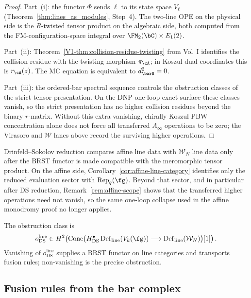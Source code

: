 \begin{proof}
Part~(i): the functor $\Phi$ sends $\ell$ to its state space $V_\ell$
\textup{(}Theorem~\textup{\ref{thm:lines_as_modules}}, Step~4\textup{)}.
The two-line OPE on the physical side is the $R$-twisted tensor product
on the algebraic side, both computed from the FM-configuration-space
integral over $\FM_2(\bC)\times E_1(2)$.

Part~(ii): Theorem~\textup{\ref{V1-thm:collision-residue-twisting}} from
Vol~I identifies the collision residue with the twisting morphism
$\pi_\cA$; in Koszul-dual coordinates this is $r_\cA(z)$. The
MC equation is equivalent to $d^2_{\barB}=0$.

Part~(iii): the ordered-bar spectral sequence controls the obstruction
classes of the strict tensor presentation. On the DNP one-loop exact
surface these classes vanish, so the strict presentation has no
higher collision residues beyond the binary $r$-matrix. Without this
extra vanishing, chirally Koszul PBW concentration alone does not
force all transferred $A_\infty$ operations to be zero; the Virasoro
and $\mathcal W$ lanes above record the surviving higher operations.
\end{proof}

\begin{remark}
\label{comp:ds-on-line-categories}
Drinfeld--Sokolov reduction compares affine line data with
$\mathcal W_N$ line data only after the BRST functor is made
compatible with the meromorphic tensor product. On the
affine side, Corollary~\ref{cor:affine-line-category} identifies
only the reduced evaluation sector with
$\operatorname{Rep}_q(\fg)$. Beyond that sector, and in
particular after DS reduction, Remark~\ref{rem:affine-scope}
shows that the transferred higher operations need not vanish, so
the same one-loop collapse used in the affine monodromy proof no
longer applies.

The obstruction class is
\[
 o_{\mathrm{DS}}^{\mathrm{line}}\in
 H^2\!\left(
 \operatorname{Cone}\bigl(
 H^\bullet_{\mathrm{DS}}\operatorname{Def}_{\mathrm{line}}(V_k(\fg))
 \longrightarrow
 \operatorname{Def}_{\mathrm{line}}(\mathcal W_N)
 \bigr)[1]\right).
\]
Vanishing of $o_{\mathrm{DS}}^{\mathrm{line}}$ supplies a BRST functor
on line categories and transports fusion rules; non-vanishing is the
precise obstruction.
\end{remark}

\subsection{Fusion rules from the bar complex}
\label{subsec:fusion-rules}

